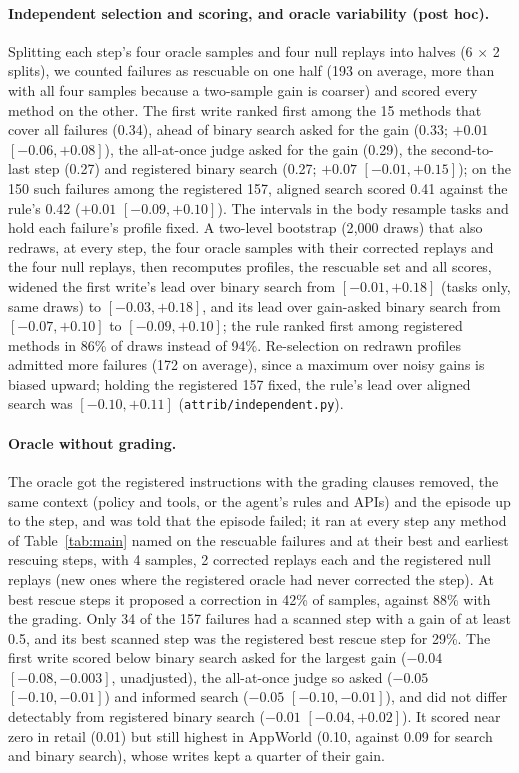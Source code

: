 \documentclass[11pt]{article}
\begin{document}
\paragraph{Independent selection and scoring, and oracle variability (post hoc).} Splitting each step's four oracle samples and four null replays into halves (6 $\times$ 2 splits), we counted failures as rescuable on one half (193 on average, more than with all four samples because a two-sample gain is coarser) and scored every method on the other. The first write ranked first among the 15 methods that cover all failures (0.34), ahead of binary search asked for the gain (0.33; $+0.01$ $[-0.06,+0.08]$), the all-at-once judge asked for the gain (0.29), the second-to-last step (0.27) and registered binary search (0.27; $+0.07$ $[-0.01,+0.15]$); on the 150 such failures among the registered 157, aligned search scored 0.41 against the rule's 0.42 ($+0.01$ $[-0.09,+0.10]$). The intervals in the body resample tasks and hold each failure's profile fixed. A two-level bootstrap (2{,}000 draws) that also redraws, at every step, the four oracle samples with their corrected replays and the four null replays, then recomputes profiles, the rescuable set and all scores, widened the first write's lead over binary search from $[-0.01,+0.18]$ (tasks only, same draws) to $[-0.03,+0.18]$, and its lead over gain-asked binary search from $[-0.07,+0.10]$ to $[-0.09,+0.10]$; the rule ranked first among registered methods in 86\% of draws instead of 94\%. Re-selection on redrawn profiles admitted more failures (172 on average), since a maximum over noisy gains is biased upward; holding the registered 157 fixed, the rule's lead over aligned search was $[-0.10,+0.11]$ (\texttt{attrib/independent.py}).

\paragraph{Oracle without grading.} The oracle got the registered instructions with the grading clauses removed, the same context (policy and tools, or the agent's rules and APIs) and the episode up to the step, and was told that the episode failed; it ran at every step any method of Table~\ref{tab:main} named on the rescuable failures and at their best and earliest rescuing steps, with 4 samples, 2 corrected replays each and the registered null replays (new ones where the registered oracle had never corrected the step). At best rescue steps it proposed a correction in 42\% of samples, against 88\% with the grading. Only 34 of the 157 failures had a scanned step with a gain of at least 0.5, and its best scanned step was the registered best rescue step for 29\%. The first write scored below binary search asked for the largest gain ($-0.04$ $[-0.08,-0.003]$, unadjusted), the all-at-once judge so asked ($-0.05$ $[-0.10,-0.01]$) and informed search ($-0.05$ $[-0.10,-0.01]$), and did not differ detectably from registered binary search ($-0.01$ $[-0.04,+0.02]$). It scored near zero in retail (0.01) but still highest in AppWorld (0.10, against 0.09 for search and binary search), whose writes kept a quarter of their gain.
\end{document}
